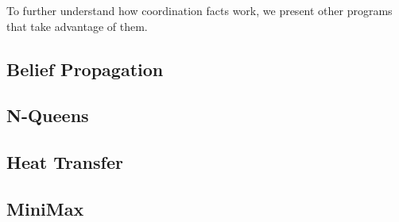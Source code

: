 To further understand how coordination facts work, we present other programs that
take advantage of them.

\subsection{Belief Propagation}\label{sec:coordination:bp}


\clearpage
\subsection{N-Queens}\label{section:coord:nqueens}


\subsection{Heat Transfer}\label{section:coord:ht}


\subsection{MiniMax}\label{section:coord:minimax}

